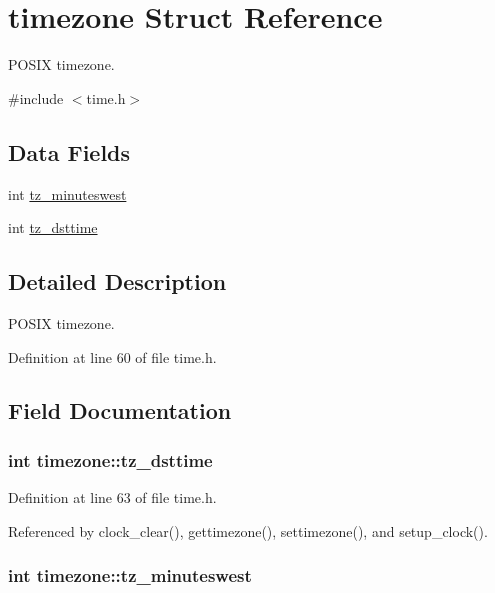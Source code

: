 \hypertarget{structtimezone}{\section{timezone Struct Reference}
\label{structtimezone}
}


P\-O\-S\-I\-X timezone.  




{\ttfamily \#include $<$time.\-h$>$}

\subsection*{Data Fields}
\begin{DoxyCompactItemize}
\item 
int \hyperlink{structtimezone_a3042f7eff6e1b980728def76b1fa0eb7}{tz\-\_\-minuteswest}
\item 
int \hyperlink{structtimezone_a85259977aeb63b17e6ce94f19afdfd99}{tz\-\_\-dsttime}
\end{DoxyCompactItemize}


\subsection{Detailed Description}
P\-O\-S\-I\-X timezone. 

Definition at line 60 of file time.\-h.



\subsection{Field Documentation}
\hypertarget{structtimezone_a85259977aeb63b17e6ce94f19afdfd99}{
\subsubsection[{tz\-\_\-dsttime}]{\setlength{\rightskip}{0pt plus 5cm}int timezone\-::tz\-\_\-dsttime}}\label{structtimezone_a85259977aeb63b17e6ce94f19afdfd99}


Definition at line 63 of file time.\-h.



Referenced by clock\-\_\-clear(), gettimezone(), settimezone(), and setup\-\_\-clock().

\hypertarget{structtimezone_a3042f7eff6e1b980728def76b1fa0eb7}{
\subsubsection[{tz\-\_\-minuteswest}]{\setlength{\rightskip}{0pt plus 5cm}int timezone\-::tz\-\_\-minuteswest}}\label{structtimezone_a3042f7eff6e1b980728def76b1fa0eb7}


